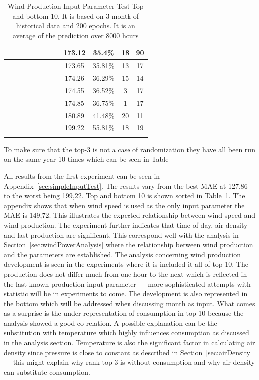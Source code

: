 \begin{center}
\begin{longtable}{|c|c|c|c|c|c|c|c|c|c|c|c|}
 \x &  &  &  &  \x &  \x &  \x &  & 173.12 & 35.4\% & 18 & 90 \\ \hline
 \x &  &  \x &  \x &  &  \x &  \x &  \x & 173.65 & 35.81\% & 13 & 17 \\ \hline
 \x &  \x &  \x &  \x &  \x &  \x &  \x &  \x & 174.26 & 36.29\% & 15 & 14 \\ \hline
 \x &  \x &  &  \x &  &  \x &  \x &  \x & 174.55 & 36.52\% & 3 & 17 \\ \hline
 \x &  &  &  \x &  &  \x &  \x &  \x & 174.85 & 36.75\% & 1 & 17 \\ \hline
 \x &  \x &  \x &  &  \x &  \x &  \x &  & 180.89 & 41.48\% & 20 & 11 \\ \hline
 \x &  \x &  &  &  \x &  \x &  \x &  \x & 199.22 & 55.81\% & 18 & 19 \\ \hline
\caption{Wind Production Input Parameter Test Top and bottom 10. It is based on 3 month of historical data and 200 epochs. It is an average of the prediction over 8000 hours}
\label{table:windProdInputParamsTop10}
\end{longtable}
\end{center}
\normalsize

To make sure that the top-3 is not a case of randomization they have all been run on the same year 10 times which can be seen in Table 


All results from the first experiment can be seen in Appendix~\ref{sec:simpleInputTest}. The results vary from the best MAE at 127,86 to the worst being 199,22. Top and bottom 10 is shown sorted in Table~\ref{table:windProdInputParamsTop10}. The appendix shows that when wind speed is used as the only input parameter the MAE is 149,72. This illustrates the expected relationship between wind speed and wind production. The experiment further indicates that time of day, air density and last production are significant. This correspond well with the analysis in Section~\ref{sec:windPowerAnalysis} where the relationship between wind production and the parameters are established. The analysis concerning wind production development is seen in the experiments where it is included it all of top 10. The production does not differ much from one hour to the next which is reflected in the last known production input parameter --- more sophisticated attempts with statistic will be in experiments to come. The development is also represented in the bottom which will be addressed when discussing month as input. What comes as a surprise is the under-representation of consumption in top 10 because the analysis showed a good co-relation. A possible explanation can be the substitution with temperature which highly influences consumption as discussed in the analysis section. Temperature is also the significant factor in calculating air density since pressure is close to constant as described in Section~\ref{sec:airDensity} --- this might explain why rank top-3 is without consumption and why air density can substitute consumption.

